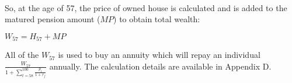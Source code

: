 \paragraph{}So, at the age of 57, the price of owned house is calculated and is added to the matured pension amount ($MP$) to obtain total wealth:

\begin{center}
	$W_{57} = H_{57} + MP$
\end{center}

All of the $W_{57}$ is used to buy an annuity which will repay an individual $\frac{W_{57}}{1+\sum^{100}_{t=58} \frac{p_t}{1+r_f}}$ annually. The calculation details are available in Appendix D. 
